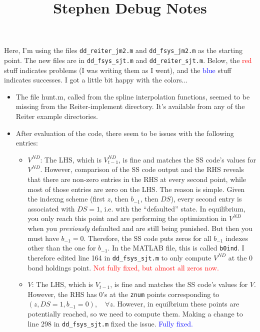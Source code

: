 \documentclass[12pt]{article}
\begin{document}
\baselineskip=17pt



\title{Stephen Debug Notes}
\date{}

\maketitle
\small

Here, I'm using the files \texttt{dd\_reiter\_jm2.m} and \texttt{dd\_fsys\_jm2.m} as the starting point. The new files are in \texttt{dd\_fsys\_sjt.m} and \texttt{dd\_reiter\_sjt.m}. Below, the \textcolor{red}{red} stuff indicates problems (I was writing them as I went), and the \textcolor{blue}{blue} stuff indicates successes. I got a little bit happy with the colors...

\begin{itemize}

\item The file hunt.m, called from the spline interpolation functions, seemed to be missing from the Reiter-implement directory. It's available from any of the Reiter example directories. 

\item After evaluation of the code, there seem to be issues with the following entries:

\begin{itemize}

\item $V^{ND}$: The LHS, which is $V^{ND}_{t-1}$, is fine and matches the SS code's values for $V^{ND}$. However, comparison of the SS code output and the RHS reveals that there are non-zero entries in the RHS at every second point, while most of those entries are zero on the LHS. The reason is simple. Given the indexng scheme (first $z$, then $b_{-1}$, then $DS$), every second entry is associated with $DS=1$, i.e. with the ``defaulted'' state. In equilibrium, you only reach this point and are performing the optimization in $V^{ND}$ when you \textit{previously} defaulted and are still being punished. But then you must have $b_{-1}=0$. Therefore, the SS code puts zeros for all $b_{-1}$ indexes other than the one for $b_{-1}$. In the MATLAB file, this is called \texttt{b0ind}. I therefore edited line 164 in \texttt{dd\_fsys\_sjt.m} to only compute $V^{ND}$ at the 0 bond holdings point. \textcolor{red}{Not fully fixed, but almost all zeros now.}

\item $V$: The LHS, which is $V_{t-1}$, is fine and matches the SS code's values for $V$. However, the RHS has 0's at the \texttt{znum} points corresponding to $(z,DS=1,b_{-1}=0), \quad \forall z$. However, in equilbrium these points are potentially reached, so we need to compute them. Making a change to line 298 in \texttt{dd\_fsys\_sjt.m} fixed the issue. \textcolor{blue}{Fully fixed.}


\end{itemize}
\end{itemize}
\end{document}
